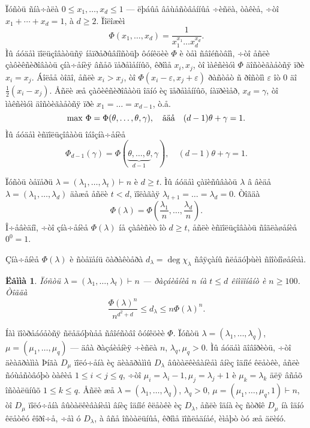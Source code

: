 \documentclass{article}
\numberwithin{equation}{section}
\theoremstyle{plain}
\newtheorem{lemma}{Ëåììà}[section]
\theoremstyle{definition}
\begin{document}
\begin{fulltext}
Ïóñòü ñíà÷àëà $0\le x_1,\ldots, x_d\le 1$ --- ëþáûå âåùåñòâåííûå ÷èñëà, òàêèå, ÷òî
$x_1+\cdots+x_d=1$, à $d\ge 2$. Ïîëîæèì
\begin{equation}
\label{e3}
\Phi(x_1,\ldots, x_d)=\frac{1}{x_1^{x_1}\ldots x_d^{x_d}}.
\end{equation}
Ìû áóäåì ïîëüçîâàòüñÿ íåïðåðûâíîñòüþ ôóíêöèè $\Phi$ è òåì ñâîéñòâîì, ÷òî åñëè
çàôèêñèðîâàòü çíà÷åíèÿ âñåõ ïåðåìåííûõ, êðîìå $x_i, x_j$, òî ìàêñèìóì $\Phi$ äîñòèãàåòñÿ
ïðè $x_i=x_j$. Áîëåå òîãî, åñëè  $x_i >x_j$, òî $\Phi(x_i-\varepsilon, x_j+\varepsilon)$
ðàñòåò ñ ðîñòîì $\varepsilon$ îò $0$ äî $\frac{1}{2}(x_i-x_j)$. Åñëè æå çàôèêñèðîâàòü îäíó èç ïåðåìåííûõ, íàïðèìåð, $x_d=\gamma$, òî ìàêñèìóì äîñòèãàåòñÿ ïðè $x_1=\ldots=x_{d-1}$, ò.å.
$$
\max\,\Phi=\Phi(\theta,\ldots,\theta,\gamma), \quad \hbox{ãäå} 
\quad (d-1)\theta+\gamma=1. 
$$
Ìû áóäåì èñïîëüçîâàòü îáîçíà÷åíèå
\begin{equation}
\label{e4}
\Phi_{d-1}(\gamma)=\Phi(\underbrace{\theta,\ldots,\theta}_{d-1},\gamma),\quad (d-1)\theta+\gamma=1.
\end{equation}

Ïóñòü òåïåðü $\lambda=(\lambda_1,\ldots,\lambda_t)\vdash n$ è $d\ge t$. Ìû áóäåì çàïèñûâàòü
$\lambda$ â âèäå $\lambda=(\lambda_1,\ldots,\lambda_d)$ äàæå åñëè $t<d$, ïîëàãàÿ
$\lambda_{t+1}=\ldots=\lambda_d=0$. Òîãäà
$$
\Phi(\lambda)=\Phi(\frac{\lambda_1}{n},\ldots,\frac{\lambda_d}{n}).
$$
 Î÷åâèäíî, ÷òî çíà÷åíèå $\Phi(\lambda)$ íå çàâèñèò 
îò $d\ge t$, åñëè èñïîëüçîâàòü ñîãëàøåíèå $0^0=1$.

Çíà÷åíèå $\Phi(\lambda)$ è ñòåïåíü õàðàêòåðà $d_\lambda=\deg\chi_\lambda$ ñâÿçàíû ñëåäóþùèì
ñîîòíîøåíèåì.
\begin{lemma}\label{L1}\cite[ëåììà 1]{GZ6}
Ïóñòü $\lambda=(\lambda_1,\ldots,\lambda_t)\vdash n$ --- ðàçáèåíèå $n$ íà $t\le d$
êîìïîíåíò è $n\ge 100$. Òîãäà
$$
\frac{\Phi(\lambda)^n}{n^{d^2+d}}\le d_\lambda\le n\Phi(\lambda)^n.
$$
\end{lemma}

Íàì ïîòðåáóåòñÿ ñëåäóþùåå ñâîéñòâî ôóíêöèè $\Phi$. Ïóñòü $\lambda=(\lambda_1,\ldots,\lambda_q)$, $\mu=(\mu_1,\ldots,\mu_q)$ --- äâà ðàçáèåíèÿ ÷èñëà $n$, 
$\lambda_q, \mu_q >0$. Ìû áóäåì ãîâîðèòü, ÷òî äèàãðàììà Þíãà $D_\mu$ ïîëó÷åíà èç äèàãðàììû
 $D_\lambda$ âûòàëêèâàíèåì âíèç îäíîé êëåòêè, åñëè ñóùåñòâóþò òàêèå $1\le i<j \le q$,
 ÷òî $\mu_i= \lambda_i-1, \mu_j=\lambda_j+1$ è $\mu_k=\lambda_k$ äëÿ âñåõ îñòàëüíûõ
 $1\le k \le q$. Åñëè æå $\lambda=(\lambda_1,\ldots,\lambda_q)$, $\lambda_q>0$,
$\mu=(\mu_1,\ldots,\mu_q,1)\vdash n$, òî $D_\mu$ ïîëó÷åíà âûòàëêèâàíèåì âíèç îäíîé
êëåòêè èç $D_\lambda$, åñëè îäíà èç ñòðîê $D_\mu$ íà îäíó êëåòêó êîðî÷å, ÷åì ó
$D_\lambda$,  à âñå îñòàëüíûå, êðîìå ïîñëåäíåé, èìåþò òó æå äëèíó.


\end{fulltext}
\end{document}
